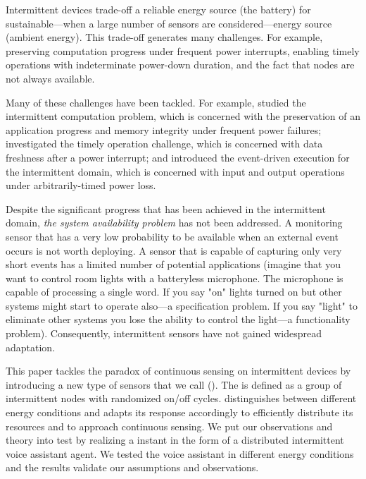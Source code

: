 Intermittent devices trade-off a reliable energy source (the battery) for sustainable---when a large number of sensors are considered---energy source (ambient energy). This trade-off generates many challenges. For example, preserving computation progress under frequent power interrupts, enabling timely operations with indeterminate power-down duration, and the fact that nodes are not always available. 
%

Many of these challenges have been tackled. For example, \cite{mementos,dino,colin2016chain} studied the intermittent computation problem, which is concerned with the preservation of an application progress and memory integrity under frequent power failures; \cite{hester2017timely} investigated the timely operation challenge, which is concerned with data freshness after a power interrupt; and \cite{yildirm2018ink} introduced the event-driven execution for the intermittent domain, which is concerned with input and output operations under arbitrarily-timed power loss.%

Despite the significant progress that has been achieved in the intermittent domain, \textit{the system availability problem} has not been addressed. A monitoring sensor that has a very low probability to be available when an external event occurs is not worth deploying. A sensor that is capable of capturing only very short events has a limited number of potential applications (imagine that you want to control room lights with a batteryless microphone. The microphone is capable of processing a single word. If you say "on" lights turned on but other systems might start to operate also---a specification problem. If you say "light" to eliminate other systems you lose the ability to control the light---a functionality problem). Consequently, intermittent sensors have not gained widespread adaptation. 

This paper tackles the paradox of continuous sensing on intermittent devices by introducing a new type of sensors that we call \textit{\fullsys} (\sys). The \sys is defined as a group of intermittent nodes with randomized on/off cycles. \sys distinguishes between different energy conditions and adapts its response accordingly to efficiently distribute its resources and to approach continuous sensing. We put our observations and theory into test by realizing a \sys instant in the form of a distributed intermittent voice assistant agent. We tested the voice assistant in different energy conditions and the results validate our assumptions and observations. 

